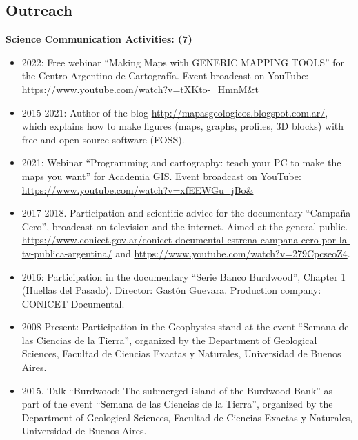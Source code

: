 \documentclass[11pt, a4paper]{article}
\begin{document}
\subsection{Outreach}

\textbf{Science Communication Activities: (7)}

\begin{itemize}
  \item 2022: Free webinar “Making Maps with GENERIC MAPPING TOOLS” for the Centro Argentino de Cartografía. Event broadcast on YouTube: \url{https://www.youtube.com/watch?v=tXKto-_HmnM&t}
  \item 2015-2021: Author of the blog \url{http://mapasgeologicos.blogspot.com.ar/}, which explains how to make figures (maps, graphs, profiles, 3D blocks) with free and open-source software (FOSS).
  \item 2021: Webinar “Programming and cartography: teach your PC to make the maps you want” for Academia GIS. Event broadcast on YouTube: \url{https://www.youtube.com/watch?v=xfEEWGu_jBo&}
  \item 2017-2018. Participation and scientific advice for the documentary “Campaña Cero”, broadcast on television and the internet. Aimed at the general public. \url{https://www.conicet.gov.ar/conicet-documental-estrena-campana-cero-por-la-tv-publica-argentina/} and \url{https://www.youtube.com/watch?v=279CpcseoZ4}.
  \item 2016: Participation in the documentary “Serie Banco Burdwood”, Chapter 1 (Huellas del Pasado). Director: Gastón Guevara. Production company: CONICET Documental.
  \item 2008-Present: Participation in the Geophysics stand at the event “Semana de las Ciencias de la Tierra”, organized by the Department of Geological Sciences, Facultad de Ciencias Exactas y Naturales, Universidad de Buenos Aires.
  \item 2015. Talk “Burdwood: The submerged island of the Burdwood Bank” as part of the event “Semana de las Ciencias de la Tierra”, organized by the Department of Geological Sciences, Facultad de Ciencias Exactas y Naturales, Universidad de Buenos Aires.
\end{itemize}
\end{document}

